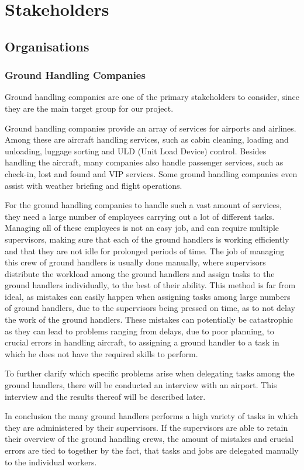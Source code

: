 \chapter{Stakeholders}
\section{Organisations}
\subsection{Ground Handling Companies}
Ground handling companies are one of the primary stakeholders to consider, since they are the main target group for our project.

Ground handling companies provide an array of services for airports and airlines. Among these are aircraft handling services, such as cabin cleaning, loading and unloading, luggage sorting and ULD (Unit Load Device) control. Besides handling the aircraft, many companies also handle passenger services, such as check-in, lost and found and VIP services. Some ground handling companies even assist with weather briefing and flight operations.

For the ground handling companies to handle such a vast amount of services, they need a large number of employees carrying out a lot of different tasks. Managing all of these employees is not an easy job, and can require multiple supervisors, making sure that each of the ground handlers is working efficiently and that they are not idle for prolonged periods of time. The job of managing this crew of ground handlers is usually done manually, where supervisors distribute the workload among the ground handlers and assign tasks to the ground handlers individually, to the best of their ability.
This method is far from ideal, as mistakes can easily happen when assigning tasks among large numbers of ground handlers, due to the supervisors being pressed on time, as to not delay the work of the ground handlers. These mistakes can potentially be catastrophic as they can lead to problems ranging from delays, due to poor planning, to crucial errors in handling aircraft, to assigning a ground handler to a task in which he does not have the required skills to perform.

To further clarify which specific problems arise when delegating tasks among the ground handlers, there will be conducted an interview with an airport. This interview and the results thereof will be described later.

In conclusion the many ground handlers performs a high variety of tasks in which they are administered by their supervisors. If the supervisors are able to retain their overview of the ground handling crews, the amount of mistakes and crucial errors are tied to together by the fact, that tasks and jobs are delegated manually to the individual workers.